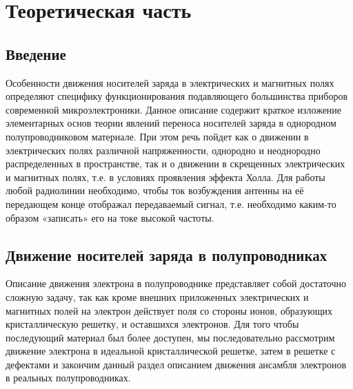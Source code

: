 
\usepackage{gensymb}
\usepackage{textcomp}
\usepackage{pythontex}


\def\labauthors{Карусевич А.А, Понур К.А.}
\def\labgroup{430}
\def\department{Кафедра квантовой физики}
\def\labnumber{1}
\def\labtheme{Движение носителей заряда в электрических и магнитных полях}

\renewcommand{\Re}{\operatorname{Re}}
\renewcommand{\Im}{\operatorname{Im}}
\renewcommand{\phi}{\varphi}
\renewcommand{\hat}{\widehat}




\section{Теоретическая часть}
\subsection*{Введение}
	Особенности движения носителей заряда в электрических и магнитных
полях определяют специфику функционирования подавляющего большинства
приборов современной микроэлектроники. Данное описание содержит краткое
изложение элементарных основ теории явлений переноса носителей заряда в 
однородном полупроводниковом материале. При этом речь пойдет как о движении
в электрических полях различной напряженности, однородно и неоднородно
распределенных в пространстве, так и о движении в скрещенных электрических
и магнитных полях, т.е. в условиях проявления эффекта Холла.
Для работы любой радиолинии необходимо, чтобы ток возбуждения антенны на её передающем конце отображал передаваемый сигнал, т.е. необходимо каким-то образом «записать» его на токе высокой частоты.



\subsection{Движение носителей заряда в полупроводниках}
Описание движения электрона в полупроводнике представляет собой достаточно сложную задачу, так как кроме внешних приложенных электрических и
магнитных полей на электрон действует поля со стороны ионов, образующих
кристаллическую решетку, и оставшихся электронов. Для того чтобы последующий материал был более доступен, мы последовательно рассмотрим движение
электрона в идеальной кристаллической решетке, затем в решетке с дефектами и
закончим данный раздел описанием движения ансамбля электронов в реальных
полупроводниках.

